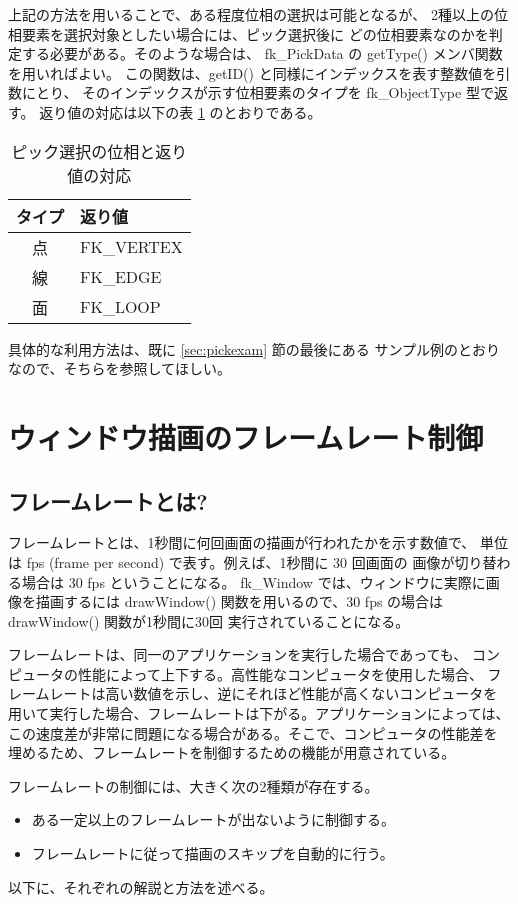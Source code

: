 上記の方法を用いることで、ある程度位相の選択は可能となるが、
2種以上の位相要素を選択対象としたい場合には、ピック選択後に
どの位相要素なのかを判定する必要がある。そのような場合は、
fk\_PickData の getType() メンバ関数を用いればよい。
この関数は、getID() と同様にインデックスを表す整数値を引数にとり、
そのインデックスが示す位相要素のタイプを fk\_ObjectType 型で返す。
返り値の対応は以下の表 \ref{tbl:picktype} のとおりである。

\begin{table}[H]
\caption{ピック選択の位相と返り値の対応}
\label{tbl:picktype}
\begin{center}
\begin{tabular}{|c|l|}
\hline
タイプ & 返り値 \\ \hline \hline
点 & FK\_VERTEX \\ \hline
線 & FK\_EDGE \\ \hline
面 & FK\_LOOP \\ \hline
\end{tabular}
\end{center}
\end{table}

具体的な利用方法は、既に \ref{sec:pickexam} 節の最後にある
サンプル例のとおりなので、そちらを参照してほしい。

\section{ウィンドウ描画のフレームレート制御}
\subsection{フレームレートとは?}
フレームレートとは、1秒間に何回画面の描画が行われたかを示す数値で、
単位は fps (frame per second) で表す。例えば、1秒間に 30 回画面の
画像が切り替わる場合は 30 fps ということになる。
fk\_Window では、ウィンドウに実際に画像を描画するには drawWindow()
関数を用いるので、30 fps の場合は drawWindow() 関数が1秒間に30回
実行されていることになる。

フレームレートは、同一のアプリケーションを実行した場合であっても、
コンピュータの性能によって上下する。高性能なコンピュータを使用した場合、
フレームレートは高い数値を示し、逆にそれほど性能が高くないコンピュータを
用いて実行した場合、フレームレートは下がる。アプリケーションによっては、
この速度差が非常に問題になる場合がある。そこで、コンピュータの性能差を
埋めるため、フレームレートを制御するための機能が用意されている。

フレームレートの制御には、大きく次の2種類が存在する。
\begin{itemize}
 \item ある一定以上のフレームレートが出ないように制御する。
 \item フレームレートに従って描画のスキップを自動的に行う。
\end{itemize}
以下に、それぞれの解説と方法を述べる。

